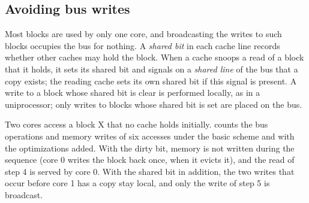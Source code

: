 \documentclass[../main.tex]{subfiles}
\begin{document}
\subsection{Avoiding bus writes}

Most blocks are used by only one core, and broadcasting the writes to such
blocks occupies the bus for nothing.  A \emph{shared bit} in each cache line
records whether other caches may hold the block.  When a cache snoops a read of a block that it
holds, it sets its shared bit and signals on a \emph{shared line} of the bus
that a copy exists; the reading cache sets its own shared bit if this signal
is present.  A write to a block whose shared bit
is clear is performed locally, as in a uniprocessor; only writes to blocks
whose shared bit is set are placed on the bus.

\begin{example}
  \label{ex:l19-write-update}
  Two cores access a block X that no cache holds initially.
   counts the bus operations and memory writes of
  six accesses under the basic scheme and with the optimizations added.  With
  the dirty bit, memory is not written during the sequence (core 0 writes the
  block back once, when it evicts it), and the read of step 4 is served by
  core 0.  With the shared bit in addition, the two writes that occur before
  core 1 has a copy stay local, and only the write of step 5 is broadcast.
\end{example}
\end{document}
